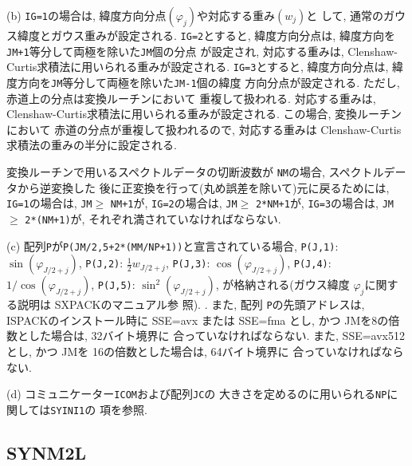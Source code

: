 \documentclass[a4j]{jsarticle}
\begin{document}
\begin{enumerate}
(b) \texttt{IG=1}の場合は, 緯度方向分点$(\varphi_j)$や対応する重み$(w_j)$と
して, 通常のガウス緯度とガウス重みが設定される.
\texttt{IG=2}とすると, 緯度方向分点は, 
緯度方向を\texttt{JM+1}等分して両極を除いた\texttt{JM}個の分点
が設定され, 対応する重みは, Clenshaw-Curtis求積法に用いられる重みが設定される.
\texttt{IG=3}とすると, 緯度方向分点は, 
緯度方向を\texttt{JM}等分して両極を除いた\texttt{JM-1}個の緯度
方向分点が設定される. ただし, 赤道上の分点は変換ルーチンにおいて
重複して扱われる.
対応する重みは, Clenshaw-Curtis求積法に用いられる重みが設定される.
この場合, 変換ルーチンにおいて
赤道の分点が重複して扱われるので, 対応する重みは
Clenshaw-Curtis求積法の重みの半分に設定される.

変換ルーチンで用いるスペクトルデータの切断波数が
\texttt{NM}の場合, スペクトルデータから逆変換した
後に正変換を行って(丸め誤差を除いて)元に戻るためには,
\texttt{IG=1}の場合は, \texttt{JM}$\ge$ \texttt{NM+1}が,
\texttt{IG=2}の場合は, \texttt{JM}$\ge$ \texttt{2*NM+1}が,
\texttt{IG=3}の場合は, \texttt{JM}$\ge$ \texttt{2*(NM+1)}が,
それぞれ満されていなければならない.

(c) 配列\texttt{P}が\texttt{P(JM/2,5+2*(MM/NP+1))}と宣言されている場合, 
   \texttt{P(J,1)}:  $\sin(\varphi_{J/2+j})$,
   \texttt{P(J,2)}:  $\frac12 w_{J/2+j}$, 
   \texttt{P(J,3)}:  $\cos(\varphi_{J/2+j})$,
   \texttt{P(J,4)}:  $1/\cos(\varphi_{J/2+j})$,
   \texttt{P(J,5)}:  $\sin^2(\varphi_{J/2+j})$,
が格納される(ガウス緯度 $\varphi_j$に関する説明は SXPACKのマニュアル参
照).
. また, 配列 \texttt{P}の先頭アドレスは, 
ISPACKのインストール時に SSE=avx または SSE=fma とし, かつ
JMを8の倍数とした場合は, 32バイト境界に
合っていなければならない.
また, SSE=avx512 とし, かつ
JMを 16の倍数とした場合は, 64バイト境界に
合っていなければならない.

(d) コミュニケーター\texttt{ICOM}および配列\texttt{JC}の
大きさを定めるのに用いられる\texttt{NP}に関しては\texttt{SYINI1}の
項を参照.


\end{enumerate}


\subsection{SYNM2L}
\end{document}

